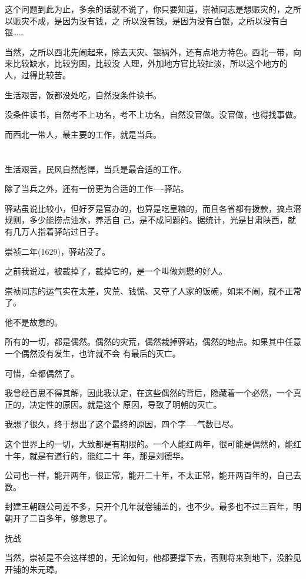 \documentclass[11pt,a4paper,onecolumn]{article}
\begin{document}
这个问题到此为止，多余的话就不说了，你只要知道，崇祯同志是想赈灾的，之所以赈灾不成，是因为没有钱，之
所以没有钱，是因为没有白银，之所以没有白银……

当然，之所以西北先闹起来，除去天灾、银祸外，还有点地方特色。西北一带，向来比较缺水，比较穷困，比较没
人理，外加地方官比较扯淡，所以这个地方的人，过得比较苦。

生活艰苦，饭都没处吃，自然没条件读书。

没条件读书，自然考不上功名，考不上功名，自然没官做。没官做，也得找事做。

而西北一带人，最主要的工作，就是当兵。

\section[\thesection]{}

生活艰苦，民风自然彪悍，当兵是最合适的工作。

除了当兵之外，还有一份更为合适的工作----驿站。

驿站虽说比较小，但好歹是官办的，也算是吃皇粮的，而且各省都有拨款，搞点潜规则，多少能捞点油水，养活自
己，是不成问题的。据统计，光是甘肃陕西，就有几万人指着驿站过日子。

崇祯二年(1629)，驿站没了。

之前我说过，被裁掉了，裁掉它的，是一个叫做刘懋的好人。

崇祯同志的运气实在太差，灾荒、钱慌、又夺了人家的饭碗，如果不闹，就不正常了。

他不是故意的。

所有的一切，都是偶然。偶然的灾荒，偶然裁掉驿站，偶然的地点。如果其中任意一个偶然没有发生，也许就不会
有最后的灭亡。

可惜，全都偶然了。

我曾经百思不得其解，因此我认定，在这些偶然的背后，隐藏着一个必然，一个真正的，决定性的原因。就是这个
原因，导致了明朝的灭亡。

我想了很久，终于想出了这个最终的原因，四个字----气数已尽。

这个世界上的一切，大致都是有期限的。一个人能红两年，很可能是偶然的，能红十年，就是有道行的，能红二十
年，那是刘德华。

公司也一样，能开两年，很正常，能开二十年，不太正常，能开两百年的，自己去数。

封建王朝跟公司差不多，只开个几年就卷铺盖的，也不少。最多也不过三百年，明朝开了二百多年，够意思了。

抚战

当然，崇祯是不会这样想的，无论如何，他都要撑下去，否则将来到地下，没脸见开铺的朱元璋。
\end{document}
